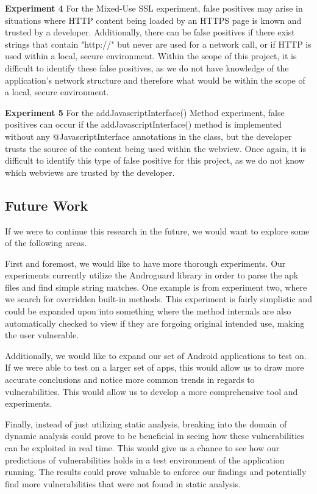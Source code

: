 \textbf{Experiment 4}
For the Mixed-Use SSL experiment, false positives may arise in situations where HTTP content being loaded by an HTTPS page is known and trusted by a developer. Additionally, there 
can be false positives if there exist strings that contain "http://" but never are used for a network call, or if HTTP is used within a local, secure environment. Within the scope of this
project, it is difficult to identify these false positives, as we do not have knowledge of the application's network structure and therefore what would be within the scope of a local, secure environment. 

\textbf{Experiment 5}
For the addJavascriptInterface() Method experiment, false positives can occur if the addJavascriptInterface() method is implemented without any @JavascriptInterface annotations in the class, but the developer 
trusts the source of the content being used within the webview. Once again, it is difficult to identify this type of false positive for this project, as we do not know which webviews are trusted by the developer. 

\subsection{Future Work}
If we were to continue this research in the future, we would 
want to explore some of the following areas. 

First and foremost, we would like to have more thorough experiments. 
Our experiments currently utilize the Androguard library in 
order to parse the apk files and find simple string matches. 
One example is from experiment two, where we search for 
overridden built-in methods. This experiment is fairly simplistic
and could be expanded upon into something where the method 
internals are also automatically checked to view if they are 
forgoing original intended use, making the user vulnerable.

Additionally, we would like to expand our set of Android 
applications to test on. If we were able to test on a larger 
set of apps, this would allow us to draw more accurate 
conclusions and notice more common trends in regards to 
vulnerabilities. This would allow us to develop a more 
comprehensive tool and experiments. 

Finally, instead of just utilizing static analysis, breaking 
into the domain of dynamic analysis could prove to be beneficial 
in seeing how these vulnerabilities can be exploited in real time. 
This would give us a chance to see how our predictions of 
vulnerabilities holds in a test environment of the application 
running. The results could prove valuable to enforce our 
findings and potentially find more vulnerabilities that were 
not found in static analysis. 
